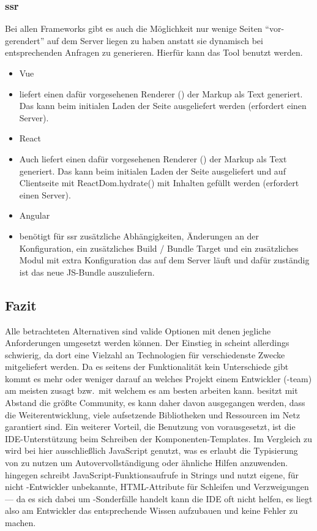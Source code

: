 \subsubsection{\acrlong{ssr}}
Bei allen Frameworks gibt es auch die Möglichkeit nur wenige Seiten ``vor-gerendert'' auf dem Server liegen zu haben anstatt sie dynamisch bei entsprechenden Anfragen zu generieren. Hierfür kann das  Tool  benutzt werden.
\begin{itemize}
    \item{Vue}
    \item[]  liefert einen dafür vorgesehenen Renderer () der Markup als Text generiert. Das kann beim initialen Laden der Seite ausgeliefert werden (erfordert einen  Server).
    \item{React}
    \item[] Auch  liefert einen dafür vorgesehenen Renderer () der Markup als Text generiert. Das kann beim initialen Laden der Seite ausgeliefert und auf Clientseite mit ReactDom.hydrate() mit Inhalten gefüllt werden (erfordert einen  Server).
    \item{Angular}
    \item[]  benötigt für \gls{ssr} zusätzliche Abhängigkeiten, Änderungen an der Konfiguration, ein zusätzliches Build / Bundle Target und ein zusätzliches Modul mit extra Konfiguration das auf dem Server läuft und dafür zuständig ist das neue JS-Bundle auszuliefern.
\end{itemize}

\subsection{Fazit}
Alle betrachteten Alternativen sind valide Optionen mit denen jegliche Anforderungen umgesetzt werden können. Der Einstieg in  scheint allerdings schwierig, da dort eine Vielzahl an Technologien für verschiedenste Zwecke mitgeliefert werden. Da es seitens der Funktionalität kein Unterschiede gibt kommt es mehr oder weniger darauf an welches Projekt einem Entwickler (-team) am meisten zusagt bzw.\ mit welchem es am besten arbeiten kann.
 besitzt mit Abstand die größte Community, es kann daher davon ausgegangen werden, dass die Weiterentwicklung, viele aufsetzende Bibliotheken und Ressourcen im Netz garantiert sind. Ein weiterer Vorteil, die Benutzung von  vorausgesetzt, ist die IDE-Unterstützung beim Schreiben der Komponenten-Templates. Im Vergleich zu  wird bei  hier ausschließlich JavaScript genutzt, was es erlaubt die Typisierung von  zu nutzen um Autovervollständigung oder ähnliche Hilfen anzuwenden.  hingegen schreibt JavaScript-Funktionsaufrufe in Strings und nutzt eigene, für nicht -Entwickler unbekannte, HTML-Attribute für Schleifen und Verzweigungen --- da es sich dabei um -Sonderfälle handelt kann die IDE oft nicht helfen, es liegt also am Entwickler das entsprechende Wissen aufzubauen und keine Fehler zu machen.

